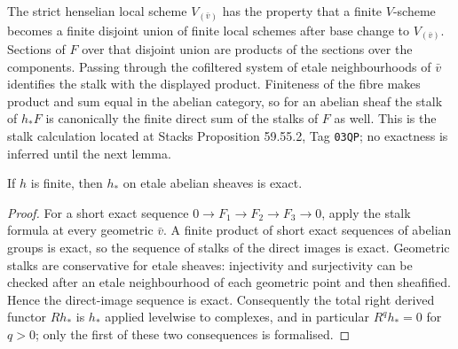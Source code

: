 \begin{remark}
\label{rem:weil-pbc-finite-stalk-formula-strict-henselian}
The strict henselian local scheme $V_{(\bar v)}$ has the property that a
finite $V$-scheme becomes a finite disjoint union of finite local schemes
after base change to $V_{(\bar v)}$.  Sections of $F$ over that disjoint union
are products of the sections over the components.  Passing through the
cofiltered system of etale neighbourhoods of $\bar v$ identifies the stalk
with the displayed product.  Finiteness of the fibre makes product and sum
equal in the abelian category, so for an abelian sheaf the stalk of $h_*F$ is
canonically the finite direct sum of the stalks of $F$ as well.  This is the stalk
calculation located at Stacks Proposition 59.55.2, Tag \texttt{03QP}; no exactness is
inferred until the next lemma.
\end{remark}

\begin{lemma}
\label{lemma:weil-pbc-finite-direct-image-exact}
\leanok
If $h$ is finite, then $h_*$ on etale abelian sheaves is exact.
\end{lemma}
\begin{proof}
\leanok

For a short exact sequence $0\to F_1\to F_2\to F_3\to0$, apply the stalk
formula at every geometric $\bar v$.  A finite product of short exact
sequences of abelian groups is exact, so the sequence of stalks of the direct
images is exact.  Geometric stalks are conservative for etale sheaves:
injectivity and surjectivity can be checked after an etale neighbourhood of
each geometric point and then sheafified.  Hence the direct-image sequence is
exact.  Consequently the total right derived functor $Rh_*$ is $h_*$ applied levelwise to
complexes, and in particular $R^qh_*=0$ for $q>0$; only the first of these two consequences
is formalised.
\end{proof}

